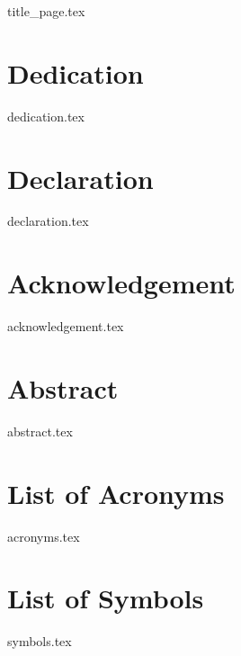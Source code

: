 \documentclass[12pt, openany]{book}
\begin{document}
    \allsectionsfont{\sffamily}

    \frontmatter

    {title_page.tex}

    \chapter{Dedication}
    {dedication.tex}

    \chapter{Declaration}
    {declaration.tex}

    \chapter{Acknowledgement}
    {acknowledgement.tex}

    \chapter{Abstract}
    {abstract.tex}

    \tableofcontents

    \listoffigures

    \listoftables

    \chapter{List of Acronyms}
    {acronyms.tex}

    \chapter{List of Symbols}
    {symbols.tex}
\end{document}
